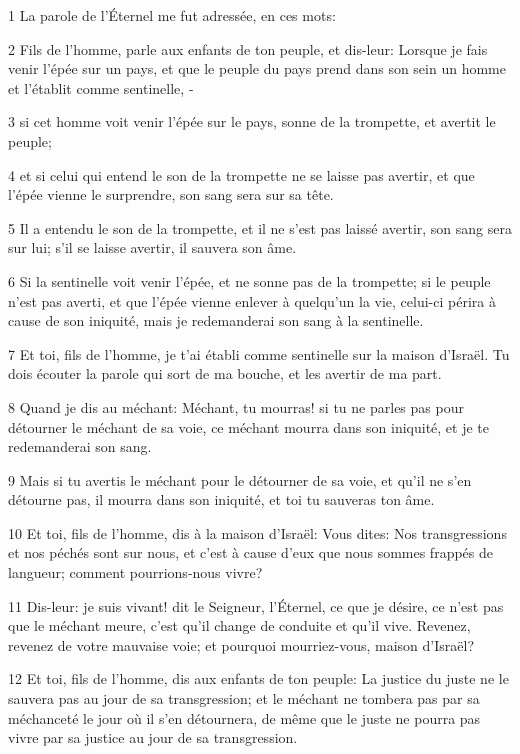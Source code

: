 \par 1 La parole de l'Éternel me fut adressée, en ces mots:
\par 2 Fils de l'homme, parle aux enfants de ton peuple, et dis-leur: Lorsque je fais venir l'épée sur un pays, et que le peuple du pays prend dans son sein un homme et l'établit comme sentinelle, -
\par 3 si cet homme voit venir l'épée sur le pays, sonne de la trompette, et avertit le peuple;
\par 4 et si celui qui entend le son de la trompette ne se laisse pas avertir, et que l'épée vienne le surprendre, son sang sera sur sa tête.
\par 5 Il a entendu le son de la trompette, et il ne s'est pas laissé avertir, son sang sera sur lui; s'il se laisse avertir, il sauvera son âme.
\par 6 Si la sentinelle voit venir l'épée, et ne sonne pas de la trompette; si le peuple n'est pas averti, et que l'épée vienne enlever à quelqu'un la vie, celui-ci périra à cause de son iniquité, mais je redemanderai son sang à la sentinelle.
\par 7 Et toi, fils de l'homme, je t'ai établi comme sentinelle sur la maison d'Israël. Tu dois écouter la parole qui sort de ma bouche, et les avertir de ma part.
\par 8 Quand je dis au méchant: Méchant, tu mourras! si tu ne parles pas pour détourner le méchant de sa voie, ce méchant mourra dans son iniquité, et je te redemanderai son sang.
\par 9 Mais si tu avertis le méchant pour le détourner de sa voie, et qu'il ne s'en détourne pas, il mourra dans son iniquité, et toi tu sauveras ton âme.
\par 10 Et toi, fils de l'homme, dis à la maison d'Israël: Vous dites: Nos transgressions et nos péchés sont sur nous, et c'est à cause d'eux que nous sommes frappés de langueur; comment pourrions-nous vivre?
\par 11 Dis-leur: je suis vivant! dit le Seigneur, l'Éternel, ce que je désire, ce n'est pas que le méchant meure, c'est qu'il change de conduite et qu'il vive. Revenez, revenez de votre mauvaise voie; et pourquoi mourriez-vous, maison d'Israël?
\par 12 Et toi, fils de l'homme, dis aux enfants de ton peuple: La justice du juste ne le sauvera pas au jour de sa transgression; et le méchant ne tombera pas par sa méchanceté le jour où il s'en détournera, de même que le juste ne pourra pas vivre par sa justice au jour de sa transgression.
